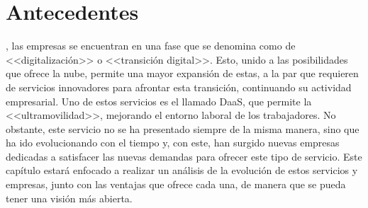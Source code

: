 \chapter{Antecedentes}
\label{chap:antecedentes}

, las empresas se encuentran en una fase que se denomina como de <<digitalización>> o <<transición digital>>. Esto, unido a las posibilidades que ofrece la nube, permite una mayor expansión de estas, a la par que requieren de servicios innovadores para afrontar esta transición, continuando su actividad empresarial. Uno de estos servicios es el llamado \acs{DaaS}, que permite la <<ultramovilidad>>, mejorando el entorno laboral de los trabajadores. No obstante, este servicio no se ha presentado siempre de la misma manera, sino que ha ido evolucionando con el tiempo y, con este, han surgido nuevas empresas dedicadas a satisfacer las nuevas demandas para ofrecer este tipo de servicio. Este capítulo estará enfocado a realizar un análisis de la evolución de estos servicios y empresas, junto con las ventajas que ofrece cada una, de manera que se pueda tener una visión más abierta.

